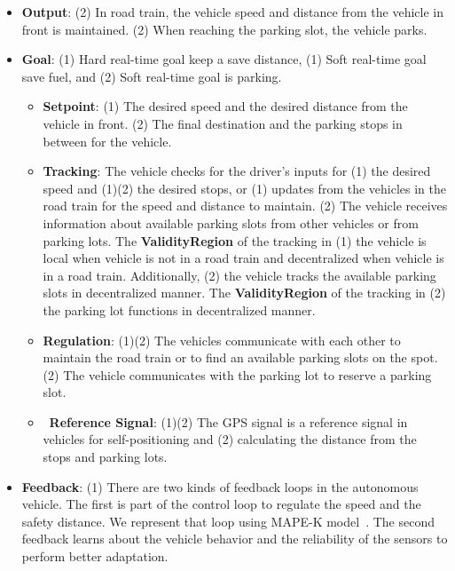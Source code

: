 \begin{itemize}
\begin{itemize}
\begin{itemize}
            \item \checkmark \textbf{Output}: (2) In road train, the vehicle speed and distance from the vehicle in front is maintained. (2) When reaching the parking slot, the vehicle parks.
            \item \checkmark \textbf{Goal}: (1) Hard real-time goal keep a save distance, (1) Soft real-time goal save fuel, and (2) Soft real-time goal is parking.
            \begin{itemize}
                \item \checkmark \textbf{Setpoint}: (1) The desired speed and the desired distance from the vehicle in front. (2) The final destination and the parking stops in between for the vehicle.
                \item \checkmark \textbf{Tracking}: The vehicle checks for the driver's inputs for (1) the desired speed and (1)(2) the desired stops, or (1) updates from the vehicles in the road train for the speed and distance to maintain. (2) The vehicle receives information about available parking slots from other vehicles or from parking lots. 
                The \textbf{ValidityRegion} of the tracking in (1) the vehicle is local when vehicle is not in a road train and decentralized when vehicle is in a road train. Additionally, (2) the vehicle tracks the available parking slots in decentralized manner. The \textbf{ValidityRegion} of the tracking in (2) the parking lot functions in decentralized manner. 
                \item \checkmark \textbf{Regulation}: (1)(2) The vehicles communicate with each other to maintain the road train or to find an available parking slots on the spot. (2) The vehicle communicates with the parking lot to reserve a parking slot.  
                \item \checkmark\  \textbf{Reference Signal}: (1)(2) The GPS signal is a reference signal in vehicles for self-positioning and (2) calculating the distance from the stops and parking lots.
            \end{itemize}
            \item \checkmark \textbf{Feedback}: (1) There are two kinds of feedback loops in the autonomous vehicle. The first is part of the control loop to regulate the speed and the safety distance. We represent that loop using MAPE-K model~\cite{Sinreich2006AnAB}. The second feedback learns about the vehicle behavior and the reliability of the sensors to perform better adaptation.
            \begin{itemize}

\end{itemize}
\end{itemize}
\end{itemize}
\end{itemize}
